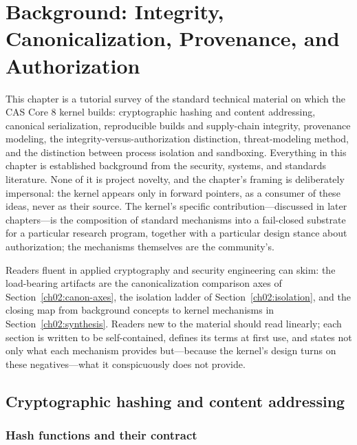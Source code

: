 \chapter{Background: Integrity, Canonicalization, Provenance, and Authorization}\label{ch02:background}

This chapter is a tutorial survey of the standard technical material on
which the CAS Core 8 kernel builds: cryptographic hashing and content
addressing, canonical serialization, reproducible builds and
supply-chain integrity, provenance modeling, the
integrity-versus-authorization distinction, threat-modeling method, and
the distinction between process isolation and sandboxing. Everything in
this chapter is established background from the security, systems, and
standards literature. None of it is project novelty, and the chapter's
framing is deliberately impersonal: the kernel appears only in forward
pointers, as a consumer of these ideas, never as their source. The
kernel's specific contribution---discussed in later chapters---is the
composition of standard mechanisms into a fail-closed substrate for a
particular research program, together with a particular design stance
about authorization; the mechanisms themselves are the community's.

\begin{remark}\label{ch02:howtoread}
Readers fluent in applied cryptography and security engineering can
skim: the load-bearing artifacts are the canonicalization comparison
axes of Section~\ref{ch02:canon-axes}, the isolation ladder of
Section~\ref{ch02:isolation}, and the closing map from background
concepts to kernel mechanisms in Section~\ref{ch02:synthesis}. Readers
new to the material should read linearly; each section is written to be
self-contained, defines its terms at first use, and states not only
what each mechanism provides but---because the kernel's design turns on
these negatives---what it conspicuously does not provide.
\end{remark}

\section{Cryptographic hashing and content addressing}\label{ch02:hashing}

\subsection{Hash functions and their contract}\label{ch02:hashcontract}

